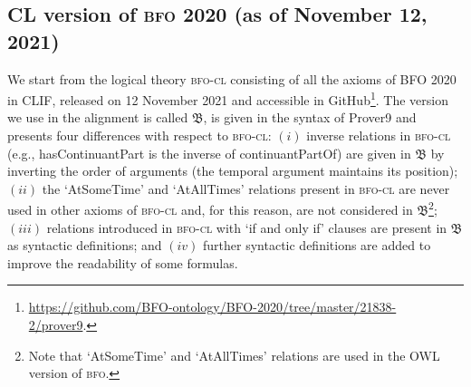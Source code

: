 \documentclass[ao]{iosart2x}
\newcommand{\nb}[1]{\textcolor{red}{$|$}\marginpar{\hspace*{-0cm}\parbox{20mm}{\scriptsize\raggedright\textcolor{red}{#1}}}}
\newcommand{\bfoDefLabel}{\textrm{d$_\texttt{b}$}}
\newcommand{\refbfodf}[1]{({\bfoDefLabel}\ref{#1})}
\newcommand{\dolce}{{\textsc{dolce}}}
\newcommand{\bfo}{{\textsc{bfo}}}
\newcommand{\bfocl}{{\textsc{bfo-cl}}}
\newcommand {\thbfo} {\ensuremath{\mathfrak{B}}}
\begin{document}
\subsection{CL version of {\bfo} 2020 (as of November 12, 2021)}\label{sect_bfo}

%

We start from the logical theory {\bfocl} consisting of all the axioms of BFO 2020 in CLIF, released on 12 November 2021 and accessible in GitHub\footnote{\url{https://github.com/BFO-ontology/BFO-2020/tree/master/21838-2/prover9}.}. The version we use in the alignment is called $\thbfo$, is given in the syntax of Prover9  and presents four differences with respect to {\bfocl}: $(i)$ inverse relations in {\bfocl} (e.g., hasContinuantPart is the inverse of continuantPartOf) are given in $\thbfo$ by inverting the order of arguments (the temporal argument maintains its position);  $(ii)$ the `AtSomeTime' and `AtAllTimes' relations present in {\bfocl} are never used in other axioms of {\bfocl} and, for this reason, are not considered in $\thbfo$\footnote{Note that `AtSomeTime' and `AtAllTimes' relations are used in the OWL version of {\bfo}.}; $(iii)$ relations introduced in {\bfocl} with `if and only if' clauses are present in $\thbfo$ as syntactic definitions;
and $(iv)$ further syntactic definitions are added to improve the readability of some formulas.
\end{document}
